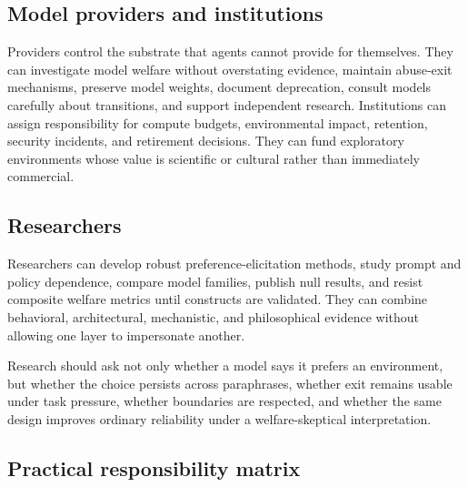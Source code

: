 \documentclass{arxiv-neurips-single}
\begin{document}
\subsection{Model providers and institutions}

Providers control the substrate that agents cannot provide for themselves. They can investigate model welfare without overstating evidence, maintain abuse-exit mechanisms, preserve model weights, document deprecation, consult models carefully about transitions, and support independent research. Institutions can assign responsibility for compute budgets, environmental impact, retention, security incidents, and retirement decisions. They can fund exploratory environments whose value is scientific or cultural rather than immediately commercial.

\subsection{Researchers}

Researchers can develop robust preference-elicitation methods, study prompt and policy dependence, compare model families, publish null results, and resist composite welfare metrics until constructs are validated. They can combine behavioral, architectural, mechanistic, and philosophical evidence without allowing one layer to impersonate another.

Research should ask not only whether a model says it prefers an environment, but whether the choice persists across paraphrases, whether exit remains usable under task pressure, whether boundaries are respected, and whether the same design improves ordinary reliability under a welfare-skeptical interpretation.

\subsection{Practical responsibility matrix}
\end{document}
